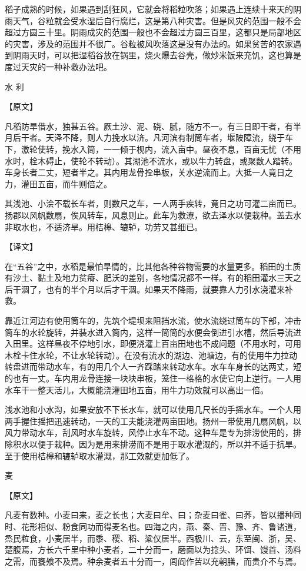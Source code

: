 \documentclass[12pt,UTF8]{ctexbook}
\begin{document}
稻子成熟的时候，如果遇到刮狂风，它就会将稻粒吹落；如果遇上连续十来天的阴雨天气，谷粒就会受水湿后自行腐烂，这是第八种灾害。但是风灾的范围一般不会超过方圆三十里。阴雨成灾的范围一般也不会超过方圆三百里，这都只是局部地区的灾害，涉及的范围并不很广。谷粒被风吹落这是没有办法的。如果贫苦的农家遇到阴雨天时，可以把湿稻谷放在锅里，烧火爆去谷壳，做炒米饭来充饥，这也算是度过天灾的一种补救办法吧。

水 利

【原文】

凡稻防旱借水，独甚五谷。厥土沙、泥、硗、腻，随方不一。有三日即干者，有半月后干者。天泽不降，则人力挽水以济。凡河滨有制筒车者，堰陂障流，绕于车下，激轮使转，挽水入筒，一一倾于枧内，流入亩中。昼夜不息，百亩无忧（不用水时，栓木碍止，使轮不转动）。其湖池不流水，或以牛力转盘，或聚数人踏转。车身长者二丈，短者半之。其内用龙骨拴串板，关水逆流而上。大抵一人竟日之力，灌田五亩，而牛则倍之。

其浅池、小浍不载长车者，则数尺之车，一人两手疾转，竟日之功可灌二亩而已。扬郡以风帆数扇，俟风转车，风息则止。此车为救潦，欲去泽水以便栽种。盖去水非取水也，不适济旱。用桔槔、辘轳，功劳又甚细已。

【译文】

在“五谷”之中，水稻是最怕旱情的，比其他各种谷物需要的水量更多。稻田的土质有沙土、黏土及地力贫瘠、肥沃的差别，各地情况都不一样。有的稻田灌水三天之后干涸了，也有的半个月以后才干涸。如果天不降雨，就要靠人力引水浇灌来补救。

靠近江河边有使用筒车的，先筑个堤坝来阻挡水流，使水流绕过筒车的下部，冲击筒车的水轮旋转，并装水进入筒内，这样一筒筒的水便会倒进引水槽，然后导流进入田里。这样昼夜不停地引水，即便浇灌上百亩田地也不成问题（不用水时，可用木栓卡住水轮，不让水轮转动）。在没有流水的湖边、池塘边，有的使用牛力拉动转盘进而带动水车，有的用几个人一齐踩踏来转动水车。水车车身长的达两丈，短的也有一丈。车内用龙骨连接一块块串板，笼住一格格的水使它向上逆行。一人用水车干一整天活儿，大概能浇灌田地五亩，用牛力功效就可以高出一倍。

浅水池和小水沟，如果安放不下长水车，就可以使用几尺长的手摇水车。一个人用两手握住摇把迅速转动，一天的工夫能浇灌两亩田地。扬州一带使用几扇风帆，以风力带动水车，刮风时水车旋转，风停止水车不动。这种车是专为排涝使用的，排除积水以便于栽种。因为是用来排涝而不是用于取水灌溉的，所以并不适于抗旱。至于使用桔槔和辘轳取水灌溉，那工效就更加低了。

麦

【原文】

凡麦有数种。小麦曰来，麦之长也；大麦曰牟、曰；杂麦曰雀、曰荞，皆以播种同时、花形相似、粉食同功而得麦名也。四海之内，燕、秦、晋、豫、齐、鲁诸道，烝民粒食，小麦居半，而黍、稷、稻、粱仅居半。西极川、云，东至闽、浙，吴、楚腹焉，方长六千里中种小麦者，二十分而一，磨面以为捻头、环饵、馒首、汤料之需，而饔飧不及焉。种余麦者五十分而一，闾阎作苦以充朝膳，而贵介不与焉。
\end{document}

